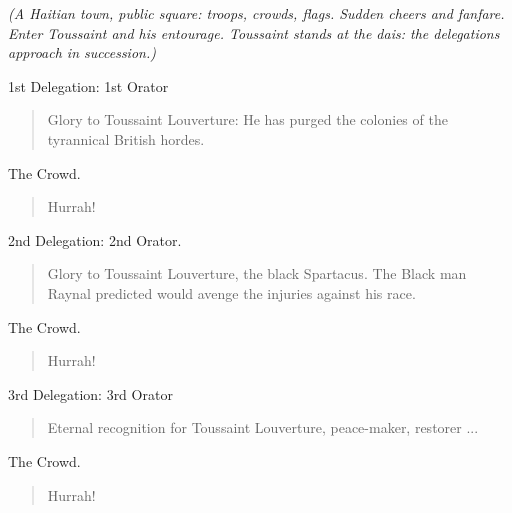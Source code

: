 \documentclass[letterpaper,article,12pt,oneside,notitlepage]{memoir}
\begin{document}
\textit{(A Haitian town, public square: troops, crowds, flags. Sudden cheers and fanfare. Enter Toussaint and his entourage. Toussaint stands at the dais: the delegations approach in succession.)}

\begin{center}1st Delegation: 1st Orator\end{center}

\begin{verse}
\indent Glory to Toussaint Louverture: He has purged the colonies of the tyrannical British hordes. \\
\end{verse}

\begin{center}The Crowd.\end{center}

\begin{verse}
Hurrah! \\
\end{verse}

\begin{center}2nd Delegation: 2nd Orator.\end{center}

\begin{verse}
Glory to Toussaint Louverture, the black Spartacus. The Black man Raynal predicted would avenge the injuries against his race. \\
\end{verse}

\begin{center}The Crowd.\end{center}

\begin{verse}
Hurrah! \\
\end{verse}

\begin{center}3rd Delegation: 3rd Orator\end{center}

\begin{verse}
Eternal recognition for Toussaint Louverture, peace-maker, restorer ... \\
\end{verse}

\clearpage

\begin{center}The Crowd.\end{center}

\begin{verse}
Hurrah! \\
\end{verse}
\end{document}
